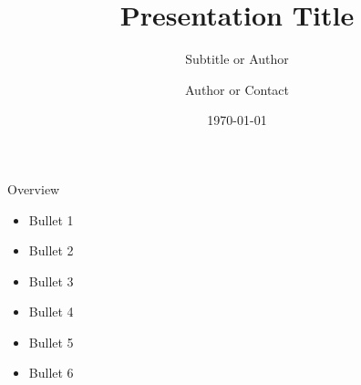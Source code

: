 \documentclass[8pt, aspectratio=169]{beamer} %
\title{Presentation Title}
\subtitle{Subtitle or Author}
\author{Author or Contact}
\date{\today}
\begin{document}
 
\frame{\titlepage}


\begin{frame}{Overview}
    \begin{itemize}
        \item Bullet 1
        \vspace{10pt}
        \item Bullet 2
        \vspace{10pt}
        \item Bullet 3
        \vspace{10pt}
        \item Bullet 4
        \vspace{10pt}
        \item Bullet 5
        \vspace{10pt}
        \item Bullet 6
    \end{itemize}
\end{frame}
\end{document}
